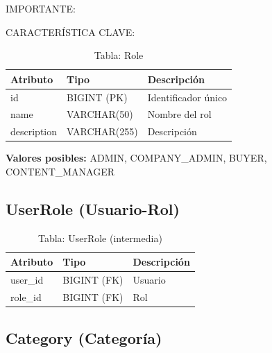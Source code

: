 \documentclass[12pt,a4paper,oneside]{book}
\begin{document}
\begin{alert}{IMPORTANTE:}
\begin{info}{CARACTERÍSTICA CLAVE:}
\begin{table}[ht]
    \centering
    \caption{Tabla: Role}
    \begin{tabular}{@{}lll@{}}
        \toprule
        \textbf{Atributo} & \textbf{Tipo} & \textbf{Descripción} \\
        \midrule
        id & BIGINT (PK) & Identificador único \\
        name & VARCHAR(50) & Nombre del rol \\
        description & VARCHAR(255) & Descripción \\
        \bottomrule
    \end{tabular}
\end{table}

\textbf{Valores posibles:} ADMIN, COMPANY\_ADMIN, BUYER, CONTENT\_MANAGER

\subsection{UserRole (Usuario-Rol)}
\label{sec:userrole}

\begin{table}[ht]
    \centering
    \caption{Tabla: UserRole (intermedia)}
    \begin{tabular}{@{}lll@{}}
        \toprule
        \textbf{Atributo} & \textbf{Tipo} & \textbf{Descripción} \\
        \midrule
        user\_id & BIGINT (FK) & Usuario \\
        role\_id & BIGINT (FK) & Rol \\
        \bottomrule
    \end{tabular}
\end{table}

\subsection{Category (Categoría)}
\label{sec:category}


\end{info}
\end{alert}
\end{document}

